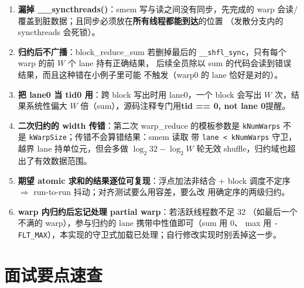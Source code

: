 \begin{enumerate}
\item \textbf{漏掉 \_\_syncthreads()}：smem 写与读之间没有同步，先完成的
  warp 会读/覆盖到脏数据；且同步必须放在\textbf{所有线程都能到达}的位置
  （发散分支内的 syncthreads 会死锁）。
\item \textbf{归约后不广播}：block\_reduce\_sum 若删掉最后的
  \texttt{\_\_shfl\_sync}，只有每个 warp 的前 $W$ 个 lane 持有正确结果，
  后续全员除以 sum 的代码会读到错误结果，而且这种错在小例子里可能
  不触发（warp0 的 lane 恰好是对的）。
\item \textbf{把 lane0 当 tid0 用}：跨 block 写出时用 lane0，一个 block
  会写出 $W$ 次，结果系统性偏大 $W$ 倍（sum），源码注释专门用\textbf{tid == 0,
  not lane 0}提醒。
\item \textbf{二次归约的 width 传错}：第二次 warp\_reduce 的模板参数是
  \texttt{kNumWarps} 不是 \texttt{kWarpSize}；传错不会算错结果：smem 读取
  带 \texttt{lane < kNumWarps} 守卫，越界 lane 持单位元，但会多做
  $\log_2 32 - \log_2 W$ 轮无效 shuffle，归约域也超出了有效数据范围。
\item \textbf{期望 atomic 求和的结果逐位可复现}：浮点加法非结合 + block
  调度不定序 $\Rightarrow$ run-to-run 抖动；对齐测试要么用容差，要么改
  用确定序的两级归约。
\item \textbf{warp 内归约后忘记处理 partial warp}：若活跃线程数不足 32
  （如最后一个不满的 warp），参与归约的 lane 携带中性值即可（sum 用 0、
  max 用 \texttt{-FLT\_MAX}），本实现的守卫式加载已处理；自行修改实现时别丢掉这一步。
\end{enumerate}

\section{面试要点速查}

